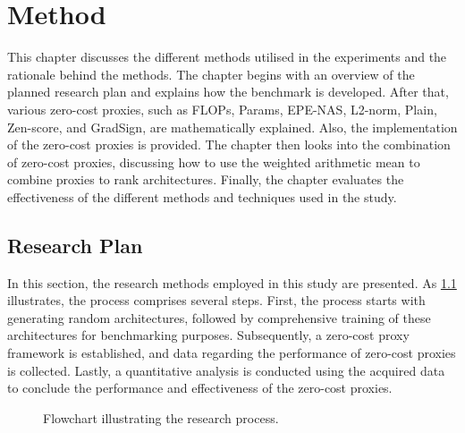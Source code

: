 \chapter{Method}\label{method}
This chapter discusses the different methods utilised in the experiments and the rationale behind the methods. The chapter begins with an overview of the planned research plan and explains how the benchmark is developed. After that, various zero-cost proxies, such as \gls{FLOPs}, Params, EPE-NAS, L2-norm, Plain, Zen-score, and GradSign, are mathematically explained. Also, the implementation of the zero-cost proxies is provided. The chapter then looks into the combination of zero-cost proxies, discussing how to use the weighted arithmetic mean to combine proxies to rank architectures. Finally, the chapter evaluates the effectiveness of the different methods and techniques used in the study.

\section{Research Plan}
In this section, the research methods employed in this study are presented. As \cref{fig:research_flowchart} illustrates, the process comprises several steps. First, the process starts with generating random architectures, followed by comprehensive training of these architectures for benchmarking purposes. Subsequently, a zero-cost proxy framework is established, and data regarding the performance of zero-cost proxies is collected. Lastly, a quantitative analysis is conducted using the acquired data to conclude the performance and effectiveness of the zero-cost proxies.
\clearpage

\begin{figure}[htbp]
  \centering
  \caption{Flowchart illustrating the research process.}
  \label{fig:research_flowchart}
\end{figure}







